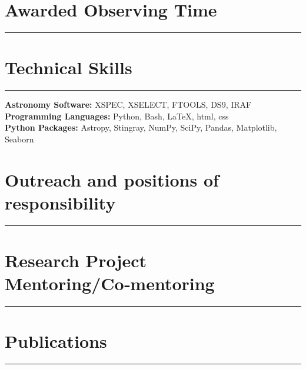 \documentclass[12pt]{article}
\begin{document}
\section*{Awarded Observing Time}
\vspace{-0.5em}
\noindent\rule{\textwidth}{0.4pt}


\vspace{0.7em}

\section*{Technical Skills}
\vspace{-0.5em}
\noindent\rule{\textwidth}{0.4pt}
\textbf{Astronomy Software:} XSPEC, XSELECT, FTOOLS, DS9, IRAF \\
\textbf{Programming Languages:} Python, Bash, \LaTeX, html, css \\
\textbf{Python Packages:} Astropy, Stingray, NumPy, SciPy, Pandas, Matplotlib, Seaborn \\

\vspace{0.7em}

\section*{Outreach and positions of responsibility}
\vspace{-0.5em}
\noindent\rule{\textwidth}{0.4pt}



\section*{Research Project Mentoring/Co‑mentoring}
\vspace{-0.5em}
\noindent\rule{\textwidth}{0.4pt}


\vspace{1em}


\section*{Publications}
\vspace{-0.5em}
\noindent\rule{\textwidth}{0.4pt}

\end{document}
